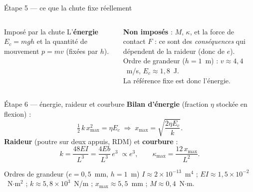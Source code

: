 \documentclass[11pt,aspectratio=169]{beamer}
\begin{document}
\begin{frame}{Étape 5 --- ce que la chute fixe réellement}
  \begin{columns}[c]
    \centering
    \footnotesize
    \begin{block}{Imposé par la chute}
    L'\textbf{énergie} $E_c=mgh$ et la quantité de mouvement $p=mv$
    (fixées par $h$).
    \end{block}
    \textbf{Non imposés} : $M$, $\kappa$, et la force de contact $F$ : ce sont des
    \emph{conséquences} qui dépendent de la raideur (donc de $e$).
    \medskip\\
    Ordre de grandeur ($h=1$~m) : $v\approx 4{,}4$~m/s, $E_c\approx 1{,}8$~J.
    \medskip\\
    \textcolor{danger}{La référence fixe est donc l'énergie.}
  \end{columns}
\end{frame}

\begin{frame}{Étape 6 --- énergie, raideur et courbure}
  \footnotesize
  \textbf{Bilan d'énergie} (fraction $\eta$ stockée en flexion) :
  \[ \tfrac12\,k\,x_{\max}^{2}=\eta E_c
     \;\Rightarrow\; x_{\max}=\sqrt{\frac{2\eta E_c}{k}} . \]
  \textbf{Raideur} (poutre sur deux appuis, RDM) et \textbf{courbure} :
  \[ k=\frac{48EI}{L^{3}}=\frac{4Eb}{L^{3}}\,e^{3}\;\propto e^{3},
     \qquad \kappa_{\max}=\frac{12\,x_{\max}}{L^{2}} . \]
  \begin{block}{Ordres de grandeur ($e=0{,}5$~mm, $h=1$~m)}
  \centering\scriptsize $I\approx 2\times10^{-13}$~m$^4$ \;;\;
  $EI\approx 1{,}5\times10^{-2}$~N$\cdot$m$^2$ \;;\;
  $k\approx 5{,}8\times10^{3}$~N/m \;;\;
  $x_{\max}\approx 5{,}5$~mm \;;\;
  $M\approx 0{,}4$~N$\cdot$m.
  \end{block}
\end{frame}
\end{document}
